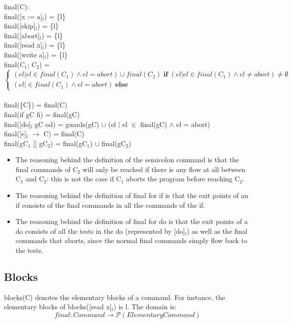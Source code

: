 \docpar
final(C):\\
final([x := a]$_l$)     = \{l\}\\
final([skip]$_l$)       = \{l\}\\
final([abort]$_l$)      = \{l\}\\
final([read x]$_l$)     = \{l\}\\
final([write a]$_l$)    = \{l\}\\
final(C$_1$; C$_2$)		  = $$
\begin{cases}
(el \vert el \in final(C_1) \wedge el = abort) \cup final(C_2) \; \textbf{if} \; (el \vert el \in final(C_1) \wedge el \neq abort) \neq \emptyset \\
(el \vert \in final(C_1) \wedge el = abort) \; \textbf{else}
\end{cases}$$\\
final(\{C\})          = final(C)\\
final(if gC fi)       = final(gC)\\
final([do]$_l$ gC od)  = 
guards(gC) $\cup$ (el $\vert$ el $\in$ final(gC) $\wedge$ el = abort)\\
final([e]$_l$ $\to$ C)    = final(C)\\
final(gC$_1$ [] gC$_2$)      = final(gC$_1$) $\cup$ final(gC$_2$)\\

\begin{itemize}
\item The reasoning behind the definition of the semicolon command is that the
final commands of C$_2$ will only be reached if there is any flow at all
between C$_1$ and C$_2$: this is not the case if C$_1$ aborts the program
before reaching C$_2$.
\item The reasoning behind the definition of final for if is that the exit points
of an if consists of the final commands in all the commands of the if.
\item The reasoning behind the definition of final for do is that the exit points
of a do consists of all the tests in the do (represented by [do]$_l$)
as well as the final commands that aborts, since the normal final commands
simply flow back to the tests.
\end{itemize}



\subsection{Blocks}
blocks(C) denotes the elementary blocks of a command.
For instance, the elementary blocks of blocks([read x]$_l$) is l. The domain is:
\[final \colon Command \to \mathcal{P}(Elementary Command)\]

